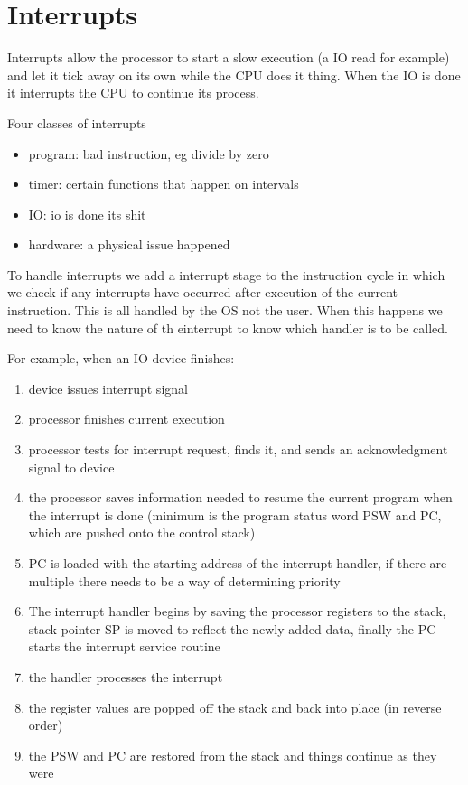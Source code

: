 \documentclass[12pt]{article}
\begin{document}
\section{Interrupts}
Interrupts allow the processor to start a slow execution (a IO read for example) and let it tick away on its own while the CPU does it thing. When the IO is done it interrupts the CPU  to continue its process.

Four classes of interrupts
\begin{itemize}
  \item program: bad instruction, eg divide by zero
  \item timer: certain functions that happen on intervals
  \item IO: io is done its shit
  \item hardware: a physical issue happened
\end{itemize}

To handle interrupts we add a interrupt stage to the instruction cycle in which we check if any interrupts have occurred after execution of the current instruction. This is all handled by the OS not the user. When this happens we need to know the nature of th einterrupt to know which handler is to be called.

For example, when an IO device finishes:
\begin{enumerate}
  \item device issues interrupt signal
  \item processor finishes current execution
  \item processor tests for interrupt request, finds it, and sends an acknowledgment signal to device
  \item the processor saves information needed to resume the current program when the interrupt is done (minimum is the program status word PSW and PC, which are pushed onto the control stack)
  \item PC is loaded with the starting address of the interrupt handler, if there are multiple there needs to be a way of determining priority
  \item The interrupt handler begins by saving the processor registers to the stack, stack pointer SP is moved to reflect the newly added data, finally the PC starts the interrupt service routine
  \item the handler processes the interrupt
  \item the register values are popped off the stack and back into place (in reverse order)
  \item the PSW and PC are restored from the stack and things continue as they were
\end{enumerate}
\end{document}
